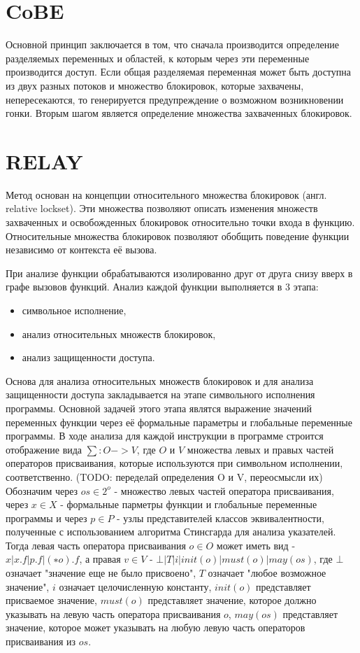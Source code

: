 \section{CoBE}
Основной принцип заключается в том, что сначала производится определение разделяемых переменных и областей, к которым через эти переменные производится доступ. Если общая разделяемая переменная может быть доступна из двух разных потоков и множество блокировок, которые захвачены, непересекаются, то генерируется предупреждение о возможном возникновении гонки. Вторым шагом является определение множества захваченных блокировок.

\section{RELAY}

Метод основан на концепции относительного множества блокировок (англ. relative lockset). Эти множества позволяют описать изменения множеств захваченных и освобожденных блокировок относительно точки входа в функцию. Относительные множества блокировок позволяют обобщить поведение функции независимо от контекста её вызова.

При анализе функции обрабатываются изолированно друг от друга снизу вверх в графе вызовов функций. Анализ каждой функции выполняется в 3 этапа:
\begin{itemize}
\item символьное исполнение,
\item анализ относительных множеств блокировок,
\item анализ защищенности доступа.
\end{itemize}

Основа для анализа относительных множеств блокировок и для анализа защищенности доступа закладывается на этапе символьного исполнения программы. Основной задачей этого этапа являтся выражение значений переменных функции через её формальные параметры и глобальные переменные программы. В ходе анализа для каждой инструкции в программе строится отображение вида $\sum: O->V$, где $O$ и $V$ множества левых и правых частей операторов присваивания, которые используются при символьном исполнении, соответственно. (TODO: переделай определения O и V, переосмысли их) Обозначим через $os \in 2^{o}$ - множество левых частей оператора присваивания, через $x \in X$ - формальные парметры функции и глобальные переменные программы и через $p \in P$ - узлы представителей классов эквивалентности, полученные с использованием алгоритма Стинсгарда для анализа указателей. Тогда левая часть оператора присваивания $o \in O$ может иметь вид - $x | x.f | p.f | (∗o).f$, а правая $v \in V$ - $⊥ | T | i | init(o) | must(o) | may(os)$, где $⊥$ означает "значение еще не было присвоено", $T$ означает "любое возможное значение", $i$ означает целочисленную константу, $init(o)$ представляет присваемое значение, $must(o)$ представляет значение, которое должно указывать на левую часть оператора присваивания $o$, $may(os)$ представляет значение, которое может указывать на любую левую часть операторов присваивания из $os$.

